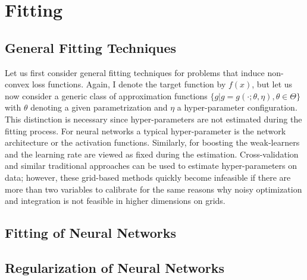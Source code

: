 \section{Fitting}


\subsection{General Fitting Techniques}

Let us first consider general fitting techniques for problems that induce non-convex
loss functions. Again, I denote the target function by $f(x)$, but let us now consider a
generic class of approximation functions $\{g | g = g(\cdot; \theta, \eta), \theta \in
\Theta\}$ with $\theta$ denoting a given parametrization and $\eta$ a hyper-parameter
configuration. This distinction is necessary since hyper-parameters are not estimated
during the fitting process. For neural networks a typical hyper-parameter is the network
architecture or the activation functions. Similarly, for boosting the weak-learners and
the learning rate are viewed as fixed during the estimation. Cross-validation and
similar traditional approaches can be used to estimate hyper-parameters on data;
however, these grid-based methods quickly become infeasible if there are more than two
variables to calibrate for the same reasons why noisy optimization and integration is
not feasible in higher dimensions on grids.

\subsection{Fitting of Neural Networks}


\subsection{Regularization of Neural Networks}
